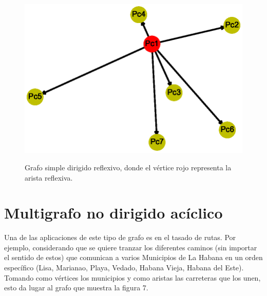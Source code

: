 \documentclass{article}
\begin{document}
\begin{center}

\end{center}
\begin{figure}[ht]
\begin{center}
\includegraphics[scale=0.7]{Graf6_random_layout.eps}\\
\caption{Grafo simple dirigido reflexivo, donde el vértice rojo representa la arista reflexiva.}
\end{center}
\end{figure}
\newpage

 \section{Multigrafo no dirigido acíclico}
Una de las aplicaciones de este tipo de grafo es en el tasado de rutas.
Por ejemplo, considerando que se quiere tranzar los diferentes caminos (sin importar el sentido de estos) que comunican a varios Municipios de La Habana en un orden específico (Lisa, Marianao, Playa, Vedado, Habana Vieja, Habana del Este). Tomando como vértices los municipios y como aristas las carreteras que los unen, esto da lugar al grafo que muestra la figura 7.
\end{document}
